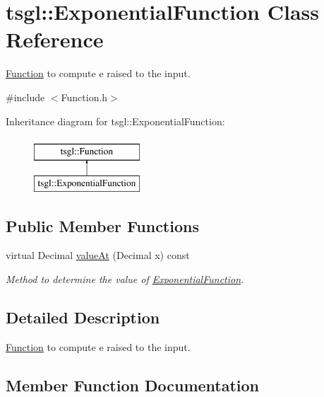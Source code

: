 \hypertarget{classtsgl_1_1_exponential_function}{}\section{tsgl\+:\+:Exponential\+Function Class Reference}
\label{classtsgl_1_1_exponential_function}


\hyperlink{classtsgl_1_1_function}{Function} to compute e raised to the input.  




{\ttfamily \#include $<$Function.\+h$>$}

Inheritance diagram for tsgl\+:\+:Exponential\+Function\+:\begin{figure}[H]
\begin{center}
\leavevmode
\includegraphics[height=2.000000cm]{classtsgl_1_1_exponential_function}
\end{center}
\end{figure}
\subsection*{Public Member Functions}
\begin{DoxyCompactItemize}
\item 
virtual Decimal \hyperlink{classtsgl_1_1_exponential_function_a059eae7c56a61c73b4c545b6c0e309d9}{value\+At} (Decimal x) const 
\begin{DoxyCompactList}\small\item\em Method to determine the value of \hyperlink{classtsgl_1_1_exponential_function}{Exponential\+Function}. \end{DoxyCompactList}\end{DoxyCompactItemize}


\subsection{Detailed Description}
\hyperlink{classtsgl_1_1_function}{Function} to compute e raised to the input. 

\subsection{Member Function Documentation}
\hypertarget{classtsgl_1_1_exponential_function_a059eae7c56a61c73b4c545b6c0e309d9}{}
